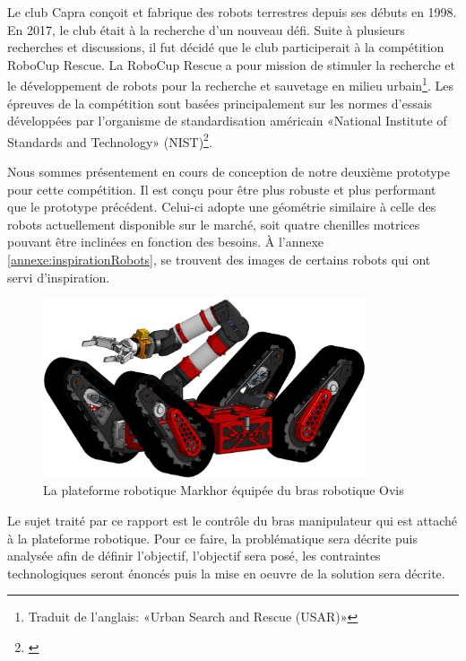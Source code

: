 \begin{introduction}
Le club Capra conçoit et fabrique des robots terrestres depuis ses débuts en 1998. En 2017, le club était à la recherche d'un nouveau défi. 
Suite à plusieurs recherches et discussions, il fut décidé que le club participerait à la compétition RoboCup Rescue. La RoboCup Rescue a pour mission de stimuler la recherche et le développement de robots pour la recherche et sauvetage en milieu urbain\footnote{Traduit de l'anglais: «Urban Search and Rescue (USAR)»}. Les épreuves de la compétition sont basées principalement sur les normes d'essais développées par l'organisme de standardisation américain «National Institute of Standards and Technology» (NIST)\footnote{\cite{jacoff_guide_2014}}.

Nous sommes présentement en cours de conception de notre deuxième prototype pour cette compétition. Il est conçu pour être plus robuste et plus performant que le prototype précédent. Celui-ci adopte une géométrie similaire à celle des robots actuellement disponible sur le marché, soit quatre chenilles motrices pouvant être inclinées en fonction des besoins. À l'annexe \ref{annexe:inspirationRobots}, se trouvent des images de certains robots qui ont servi d'inspiration.

\begin{figure}
    \centering %
    \includegraphics[width=0.85\textwidth]{Figures/markhor_ovis_cad.png}
    \caption{La plateforme robotique Markhor équipée du bras robotique Ovis}
    \label{fig:markhor_ovis_CAD}
\end{figure}

Le sujet traité par ce rapport est le contrôle du bras manipulateur qui est attaché à la plateforme robotique. Pour ce faire, la problématique sera décrite puis analysée afin de définir l'objectif, l'objectif sera posé, les contraintes technologiques seront énoncés puis la mise en oeuvre de la solution sera décrite.

\end{introduction}

